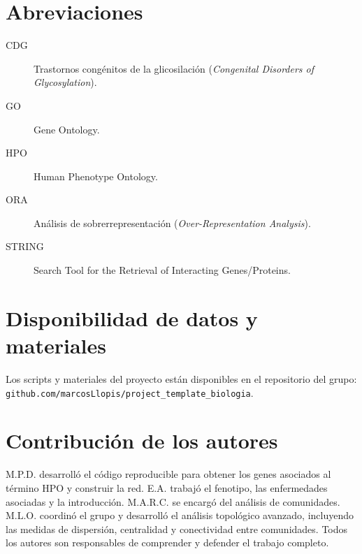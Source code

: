 \documentclass{bmcart}
\begin{document}
	\begin{backmatter}
	
		\section*{Abreviaciones}
		\begin{description}
			\item[CDG] Trastornos congénitos de la glicosilación (\textit{Congenital Disorders of Glycosylation}).
			\item[GO] Gene Ontology.
			\item[HPO] Human Phenotype Ontology.
			\item[ORA] Análisis de sobrerrepresentación (\textit{Over-Representation Analysis}).
			\item[STRING] Search Tool for the Retrieval of Interacting Genes/Proteins.
		\end{description}

		\section*{Disponibilidad de datos y materiales}
		Los scripts y materiales del proyecto están disponibles en el repositorio del grupo: \texttt{github.com/marcosLlopis/project\_template\_biologia}.

		\section*{Contribución de los autores}
		M.P.D. desarrolló el código reproducible para obtener los genes asociados al término HPO y construir la red. E.A. trabajó el fenotipo, las enfermedades asociadas y la introducción. M.A.R.C. se encargó del análisis de comunidades. M.L.O. coordinó el grupo y desarrolló el análisis topológico avanzado, incluyendo las medidas de dispersión, centralidad y conectividad entre comunidades. Todos los autores son responsables de comprender y defender el trabajo completo.

	
	\end{backmatter}
\end{document}
